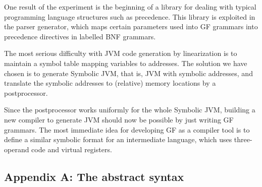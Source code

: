 \documentclass[12pt]{article}
\begin{document}
One result of the experiment is the beginning of a
library for dealing with typical programming language structures
such as precedence. This library is exploited in the parser
generator, which maps certain parameters used into GF grammars
into precedence directives in labelled BNF grammars.

The most serious difficulty with JVM code generation by linearization
is to maintain a symbol table mapping variables to addresses.
The solution we have chosen is to generate Symbolic JVM, that is,
JVM with symbolic addresses, and translate the symbolic addresses to
(relative) memory locations by a postprocessor. 

Since the postprocessor works uniformly for the whole Symbolic JVM,
building a new compiler to generate JVM should now be 
possible by just writing GF grammars. The most immediate
idea for developing GF as a compiler tool is to define
a similar symbolic format for an intermediate language,
which uses three-operand code and virtual registers.








\newpage
\subsection*{Appendix A: The abstract syntax}
\end{document}
